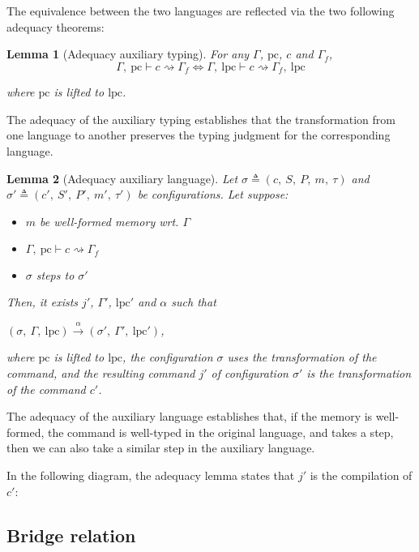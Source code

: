\documentclass[10pt]{article}
\newcommand{\pc}{\mathrm{pc}}
\newcommand{\lpc}{\mathrm{lpc}}
\newcommand{\ctx}{\Gamma}
\newcommand{\conf}{\sigma}
\newcommand{\typing}[4]{ #1,~#2 \vdash #3 \rightsquigarrow #4}
\newcommand{\typingaux}[5]{ #1,~#2 \vdash #3 \rightsquigarrow #4,~#5}
\newcommand{\execaux}[7] { (#1,~#2,~#3) \xrightarrow{#4} (#5,~#6,~#7) }
\newtheorem{lemma}{Lemma}
\begin{document}
The equivalence between the two languages are reflected via the two following adequacy theorems:

\begin{lemma}[Adequacy auxiliary typing]
  For any $\ctx$, $\pc$, $c$ and $\ctx_{f}$,
  \[
  \typing{\ctx}{\pc}{c}{\ctx_{f}}
  \Leftrightarrow
    \typingaux{\ctx}{\lpc}{c}{\ctx_{f}}{\lpc}
  \]

  where $\pc$ is lifted to $\lpc$.
\end{lemma}

The adequacy of the auxiliary typing establishes that the transformation from one language to
another preserves the typing judgment for the corresponding language.

\begin{lemma}[Adequacy auxiliary language]
  Let $\conf \triangleq (c,~S,~P,~m,~\tau)$ and
  $\conf' \triangleq (c',~S',~P',~m',~\tau')$ be configurations.
  Let suppose:
  \begin{itemize}
    \item $m$ be well-formed memory wrt. $\ctx$
    \item $\typing{\ctx}{\pc}{c}{\ctx_{f}}$
    \item $\conf$ steps to $\conf'$
  \end{itemize}

  Then, it exists $j'$, $\ctx'$, $\lpc'$ and $\alpha$ such that

  \( \execaux{\conf}{\ctx}{\lpc}{\alpha}{\conf'}{\ctx'}{\lpc'} \),

  where $\pc$ is lifted to $\lpc$, the configuration $\conf$ uses the transformation of the command,
  and the resulting command $j'$ of configuration $\conf'$ is the transformation of the command $c'$.
\end{lemma}

The adequacy of the auxiliary language establishes that, if the memory is well-formed, the
command is well-typed in the original language, and takes a step, then we can also take a similar
step in the auxiliary language.

In the following diagram, the adequacy lemma states that $j'$ is the compilation of $c'$:


\subsection{Bridge relation}%
\label{subsec:brigde_rel}
\end{document}
